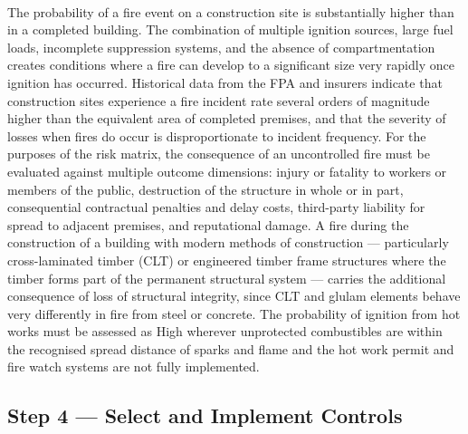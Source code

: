 \paragraph{}
The probability of a fire event on a construction site is substantially higher than in a completed building. The combination of multiple ignition sources, large fuel loads, incomplete suppression systems, and the absence of compartmentation creates conditions where a fire can develop to a significant size very rapidly once ignition has occurred. Historical data from the FPA and insurers indicate that construction sites experience a fire incident rate several orders of magnitude higher than the equivalent area of completed premises, and that the severity of losses when fires do occur is disproportionate to incident frequency. For the purposes of the risk matrix, the consequence of an uncontrolled fire must be evaluated against multiple outcome dimensions: injury or fatality to workers or members of the public, destruction of the structure in whole or in part, consequential contractual penalties and delay costs, third-party liability for spread to adjacent premises, and reputational damage. A fire during the construction of a building with modern methods of construction --- particularly cross-laminated timber (CLT) or engineered timber frame structures where the timber forms part of the permanent structural system --- carries the additional consequence of loss of structural integrity, since CLT and glulam elements behave very differently in fire from steel or concrete. The probability of ignition from hot works must be assessed as High wherever unprotected combustibles are within the recognised spread distance of sparks and flame and the hot work permit and fire watch systems are not fully implemented.

\subsection{Step 4 --- Select and Implement Controls}

